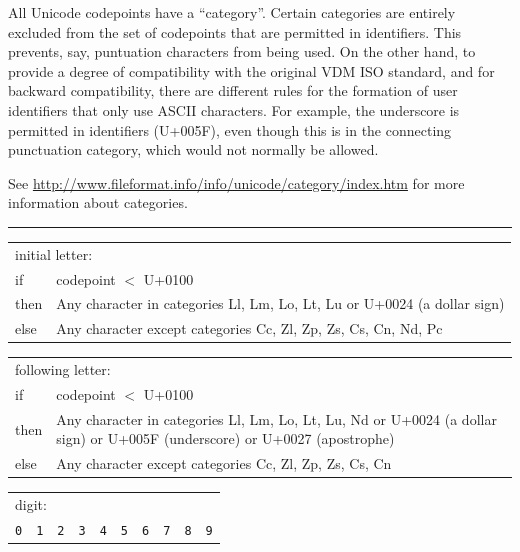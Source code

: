 \documentclass{overturerepchap}
\newcommand{\blankline}{\vspace{\baselineskip}}
\begin{document}
All Unicode codepoints have a ``category''. Certain categories are
entirely excluded from the set of codepoints that are permitted in
identifiers. This prevents, say, puntuation characters from being
used. On the other hand, to provide a degree of compatibility with the
original VDM ISO standard, and for backward compatibility, there are
different rules for the formation of user identifiers that only use
ASCII characters. For example, the underscore is permitted in
identifiers (U+005F), even though this is in the connecting
punctuation category, which would not normally be allowed. 

See \url{http://www.fileformat.info/info/unicode/category/index.htm} for
more information about categories. 

\begin{table}[ht]
\setlength{\tabcolsep}{3.5mm}
\setlength{\arraycolsep}{3.5mm}

\rule{\textwidth}{.5mm}
        \begin{tabular}{lp{13cm}}
        \multicolumn{2}{l}{\rm initial letter:} \\
        if   & codepoint $<$ U+0100 \\
        then &  Any character in categories Ll, Lm, Lo, Lt, Lu or U+0024 (a dollar sign) \\
        else & Any character except categories Cc, Zl, Zp, Zs, Cs,
                Cn, Nd, Pc \\
    \end{tabular}

\blankline
\begin{tabular}{lp{13cm}}
        \multicolumn{2}{l}{following letter: }\\
        if   & codepoint $<$ U+0100 \\
        then & Any character in categories Ll, Lm, Lo, Lt, Lu, Nd or 
               U+0024 (a dollar sign) or U+005F (underscore) or U+0027 (apostrophe) \\
        else & Any character except categories Cc, Zl, Zp, Zs, Cs, Cn 
    \end{tabular}

\blankline
    \begin{tabular}{*{10}{l}}
        \multicolumn{10}{l}{digit:} \\
        {\tt 0}
        & {\tt 1} 
        & {\tt 2} 
        & {\tt 3} 
        & {\tt 4} 
        & {\tt 5}
        & {\tt 6} 
        & {\tt 7} 
        & {\tt 8} 
        & {\tt 9} 
     \end{tabular}


\end{table}
\end{document}
